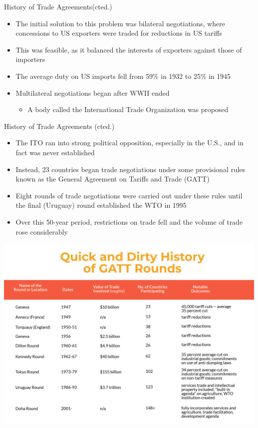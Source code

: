\documentclass[10pt,hyperref={CJKbookmarks=true},xcolor=dvipsnames,aspectratio=169]{beamer}
\begin{document}
\begin{frame}{History of Trade Agreements(cted.)}
	\begin{itemize}
		\item 	The initial solution to this problem was bilateral
		negotiations, where concessions to US exporters
		were traded for reductions in US tariffs
		\item This was feasible, as it balanced the interests of
		exporters against those of importers
		\item The average duty on US imports fell from 59\% in
		1932 to 25\% in 1945
		\item Multilateral negotiations began after WWII ended
		\begin{itemize}
			\item A body called the International Trade Organization was			proposed 
		\end{itemize}
		
	\end{itemize}
\end{frame}

\begin{frame}{History of Trade Agreements (cted.)}
	\begin{itemize}
		\item The ITO ran into strong political opposition, especially
		in the U.S., and in fact was never established
		\item Instead, 23 countries began trade negotiations under
		some provisional rules known as the General
		Agreement on Tariffs and Trade (GATT)
		\item Eight rounds of trade negotiations were carried out
		under these rules until the final (Uruguay) round
		established the WTO in 1995
		\item Over this 50-year period, restrictions on trade fell and
		the volume of trade rose considerably
	\end{itemize}
\end{frame}

\begin{frame}
\centering \includegraphics[scale=0.12]{fig/politic/gatt}
\end{frame}
\end{document}
